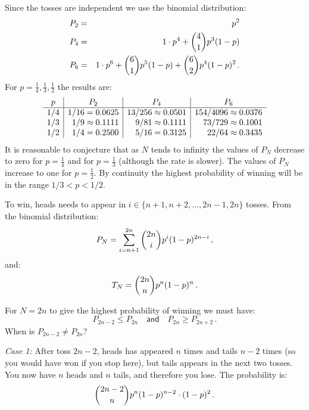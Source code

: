\solution{}

 Since the tosses are independent we use the binomial distribution:
\begin{eqnarray*}
P_2 &=& p^2\\
P_4 &=& 1\cdot p^4 + \displaystyle{4 \choose 1}p^3(1-p)\\
P_6 &=& 1\cdot p^6 + \displaystyle{6 \choose 1}p^5(1-p)+\displaystyle{6 \choose 2}p^4(1-p)^2\,.
\end{eqnarray*}
For $p=\frac{1}{4}, \frac{1}{3}, \frac{1}{2}$ the results are:
\[
\begin{array}{r|r|r|r}
\multicolumn{1}{c|}{p}& \multicolumn{1}{c|}{P_2} & \multicolumn{1}{c|}{P_4} & \multicolumn{1}{c}{P_6}\\\hline
1/4 & 1/16=0.0625 & 13/256\approx 0.0501&154/4096\approx 0.0376\\
1/3 & 1/9\approx 0.1111 & 9/81\approx 0.1111&73/729\approx 0.1001\\
1/2 & 1/4=0.2500 & 5/16= 0.3125&22/64\approx 0.3435
\end{array}
\]
It is reasonable to conjecture that as $N$ tends to infinity the values of $P_N$ decrease to zero for $p=\frac{1}{4}$ and for $p=\frac{1}{3}$ (although the rate is slower). The values of $P_N$ increase to one for $p=\frac{1}{2}$. By continuity the highest probability of winning will be in the range $1/3 < p < 1/2$.

 To win, heads needs to appear in $i\in\{n+1, n+2, \ldots, 2n-1, 2n\}$ tosses. From the binomial distribution:
\[
P_N = \sum_{i=n+1}^{2n} \displaystyle{2n \choose i} p^i (1-p)^{2n-i}\,,
\]
and:
\[
T_N = \displaystyle{2n \choose n} p^n (1-p)^{n}\,.
\]

 For $N=2n$ to give the highest probability of winning we must have:
\[
P_{2n-2} \leq P_{2n} \quad \textsf{and} \quad P_{2n}\geq P_{2n+2}\,.
\]
When is $P_{2n-2}\not = P_{2n}$?

\textit{Case 1:}
After toss $2n-2$, heads has appeared $n$ times and tails  $n-2$ times (so you would have won if you stop here), but tails appears in the next two tosses. You now have $n$ heads and $n$ tails, and therefore you lose. The probability is:
\[
\displaystyle{2n-2 \choose n}p^n(1-p)^{n-2} \cdot (1-p)^2\,.
\]


